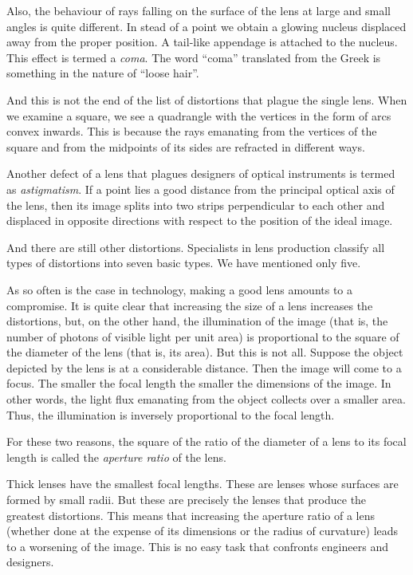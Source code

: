 Also, the behaviour of rays falling on the surface of the lens at large and small angles is quite different. In­ stead of a point we obtain a glowing nucleus displaced away from the proper position. A tail-like appendage is attached to the nucleus. This effect is termed a \emph{coma}. The word ``coma'' translated from the Greek is something in the nature of ``loose hair''.

And this is not the end of the list of distortions that plague the single lens. When we examine a square, we see a quadrangle with the vertices in the form of arcs convex inwards. This is because the rays emanating from the vertices of the square and from the midpoints of its sides are refracted in different ways.

Another defect of a lens that plagues designers of opti­cal instruments is termed as \emph{astigmatism}. If a point lies a good distance from the principal optical axis of the lens, then its image splits into two strips perpendicular to each other and displaced in opposite directions with re­spect to the position of the ideal image.

And there are still other distortions. Specialists in lens production classify all types of distortions into seven basic types. We have mentioned only five.

As so often is the case in technology, making a good lens amounts to a compromise. It is quite clear that increasing the size of a lens increases the distortions, but, on the other hand, the illumination of the image (that is, the number of photons of visible light per unit area) is proportional to the square of the diameter of the lens (that is, its area). But this is not all. Suppose the object depicted by the lens is at a considerable dis­tance. Then the image will come to a focus. The smaller the focal length the smaller the dimensions of the image. In other words, the light flux emanating from the object collects over a smaller area. Thus, the illumination is inversely proportional to the focal length.

For these two reasons, the square of the ratio of the diameter of a lens to its focal length is called the \emph{aperture ratio} of the lens.

Thick lenses have the smallest focal lengths. These are lenses whose surfaces are formed by small radii. But these are precisely the lenses that produce the greatest distor­tions. This means that increasing the aperture ratio of a lens (whether done at the expense of its dimensions or the radius of curvature) leads to a worsening of the image. This is no easy task that confronts engineers and design­ers.

